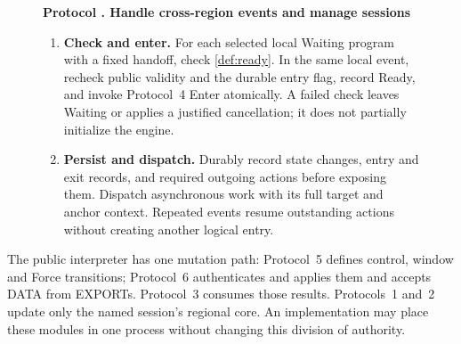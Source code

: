 \documentclass[11pt,a4paper]{article}
\newcounter{protocol}
\newenvironment{protocol}[3][htbp]{\begin{figure}[#1]\refstepcounter{protocol}\label{#2}
\begin{mdframed}[linewidth=.6pt,skipabove=0pt,skipbelow=0pt,
innertopmargin=7pt,innerbottommargin=7pt]\small
\textbf{Protocol \theprotocol. #3}\par\smallskip}{\end{mdframed}\end{figure}}
\begin{document}
\begin{protocol}[H]{alg:rotation}{Handle cross-region events and manage sessions}
\begin{enumerate}[label=\textbf{\arabic*)},itemsep=3pt]
\item \textbf{Check and enter.} For each selected local Waiting
program with a fixed handoff, check \cref{def:ready}. In the same local
event, recheck public validity and the durable entry flag, record Ready,
and invoke Protocol~4 Enter atomically. A failed check leaves Waiting
or applies a justified cancellation; it does not partially initialize
the engine.
\item \textbf{Persist and dispatch.} Durably record state changes,
entry and exit records, and required outgoing actions before exposing
them. Dispatch asynchronous work with its full target and anchor
context. Repeated events resume outstanding actions without creating
another logical entry.
\end{enumerate}
\end{protocol}

The public interpreter has one mutation path: Protocol~5 defines
control, window and Force transitions; Protocol~6 authenticates and
applies them and accepts DATA from EXPORTs. Protocol~3 consumes those results.
Protocols~1 and~2 update only the named session's regional core.
An implementation may place these modules in one process without
changing this division of authority.
\end{document}
